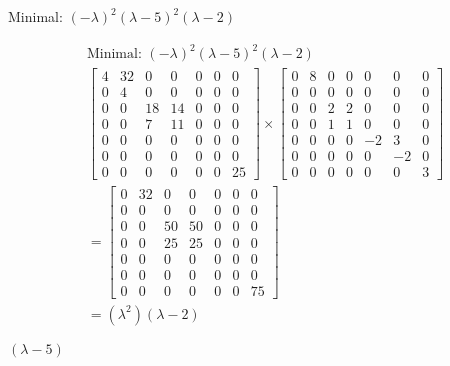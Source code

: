 \documentclass{report}
\begin{document}
\begin{enumerate}
\begin{enumerate}
            Minimal: $(-\lambda)^{2}(\lambda-5)^{2}(\lambda-2)$
            
            \[
            \begin{aligned}
            &\text{Minimal: }(-\lambda)^{2}(\lambda-5)^{2}(\lambda-2) \\
            &\begin{bmatrix}
            4 & 32 & 0 & 0 & 0 & 0 & 0 \\
            0 & 4 & 0 & 0 & 0 & 0 & 0 \\
            0 & 0 & 18 & 14 & 0 & 0 & 0 \\
            0 & 0 & 7 & 11 & 0 & 0 & 0 \\
            0 & 0 & 0 & 0 & 0 & 0 & 0 \\
            0 & 0 & 0 & 0 & 0 & 0 & 0 \\
            0 & 0 & 0 & 0 & 0 & 0 & 25
            \end{bmatrix}
            \times
            \begin{bmatrix}
            0 & 8 & 0 & 0 & 0 & 0 & 0 \\
            0 & 0 & 0 & 0 & 0 & 0 & 0 \\
            0 & 0 & 2 & 2 & 0 & 0 & 0 \\
            0 & 0 & 1 & 1 & 0 & 0 & 0 \\
            0 & 0 & 0 & 0 & -2 & 3 & 0 \\
            0 & 0 & 0 & 0 & 0 & -2 & 0 \\
            0 & 0 & 0 & 0 & 0 & 0 & 3
            \end{bmatrix} \\
            &=
            \begin{bmatrix}
            0 & 32 & 0 & 0 & 0 & 0 & 0 \\
            0 & 0 & 0 & 0 & 0 & 0 & 0 \\
            0 & 0 & 50 & 50 & 0 & 0 & 0 \\
            0 & 0 & 25 & 25 & 0 & 0 & 0 \\
            0 & 0 & 0 & 0 & 0 & 0 & 0 \\
            0 & 0 & 0 & 0 & 0 & 0 & 0 \\
            0 & 0 & 0 & 0 & 0 & 0 & 75
            \end{bmatrix} \\
            &= (\lambda^{2})(\lambda-2)
            \end{aligned}
            \]
            
            $(\lambda-5)$
            

\end{enumerate}
\end{enumerate}
\end{document}
